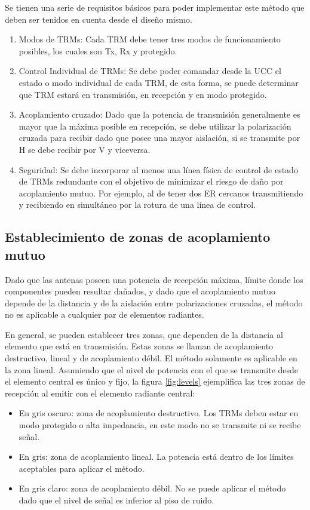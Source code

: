 Se tienen una serie de requisitos básicos para poder implementar este método que deben ser tenidos en cuenta desde el diseño
mismo.

\begin{enumerate}
	\item Modos de TRMs: Cada TRM debe tener tres modos de funcionamiento posibles, los cuales son Tx, Rx y protegido.
	\item Control Individual de TRMs: Se debe poder comandar desde la UCC el estado o modo individual de cada TRM, de esta forma, 
		se puede determinar que TRM estará en transmisión, en recepción y en modo protegido.
	\item Acoplamiento cruzado: Dado que la potencia de transmisión generalmente es mayor que la máxima posible en recepción, se
		debe utilizar la polarización cruzada para recibir dado que posee una mayor aislación, si se transmite por H se debe recibir
		por V y viceversa.
	\item Seguridad: Se debe incorporar al menos una línea física de control de estado de TRMs redundante con el objetivo de
		minimizar el riesgo de daño por acoplamiento mutuo. Por ejemplo, al de tener dos ER cercanos transmitiendo y recibiendo en
		simultáneo por la rotura de una línea de control.
\end{enumerate}


\subsection{Establecimiento de zonas de acoplamiento mutuo} \label{ssc:mutual_zone}

Dado que las antenas poseen una potencia de recepción máxima, límite donde los componentes pueden resultar dañados, y dado
que el acoplamiento mutuo depende de la distancia y de la aislación entre polarizaciones cruzadas, el método no es aplicable a
cualquier par de elementos radiantes.

En general, se pueden establecer tres zonas, que dependen de la distancia al elemento que está en transmisión. Estas zonas se
llaman de acoplamiento destructivo, lineal y de acoplamiento débil. El método solamente es aplicable en la zona lineal.
Asumiendo que el nivel de potencia con el que se transmite desde el elemento central es único y fijo, la figura \ref{fig:levels}
ejemplifica las tres zonas de recepción al emitir con el elemento radiante central:
\begin{itemize}
	\item En gris oscuro: zona de acoplamiento destructivo. Los TRMs deben estar en modo protegido o alta impedancia, en este modo
		no se transmite ni se recibe señal.
	\item En gris: zona de acoplamiento lineal. La potencia está dentro de los límites aceptables para aplicar el método.
	\item En gris claro: zona de acoplamiento débil. No se puede aplicar el método dado que el nivel de señal es inferior al piso
		de ruido. 
\end{itemize}

